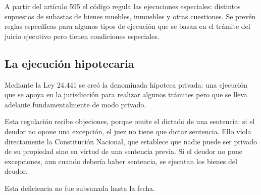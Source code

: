 \documentclass[12pt,oneside]{book}
\begin{document}
A partir del artículo 595 el código regula las ejecuciones especiales: distintos supuestos de subastas de bienes muebles, inmuebles y otras cuestiones. Se prevén reglas específicas para algunos tipos de ejecución que se basan en el trámite del juicio ejecutivo pero tienen condiciones especiales.

\subsection{La ejecución hipotecaria}

Mediante la Ley 24.441 se creó la denominada hipoteca privada: una ejecución que se apoya en la jurisdicción para realizar algunos trámites pero que se lleva adelante fundamentalmente de modo privado.

Esta regulación recibe objeciones, porque omite el dictado de una sentencia: si el deudor no opone una excepción, el juez no tiene que dictar sentencia. Ello viola directamente la Constitución Nacional, que establece que nadie puede ser privado de su propiedad sino en virtud de una sentencia previa. Si el deudor no pone excepciones, aun cuando debería haber sentencia, se ejecutan los bienes del deudor.

Esta deficiencia no fue subsanada hasta la fecha.
\end{document}
